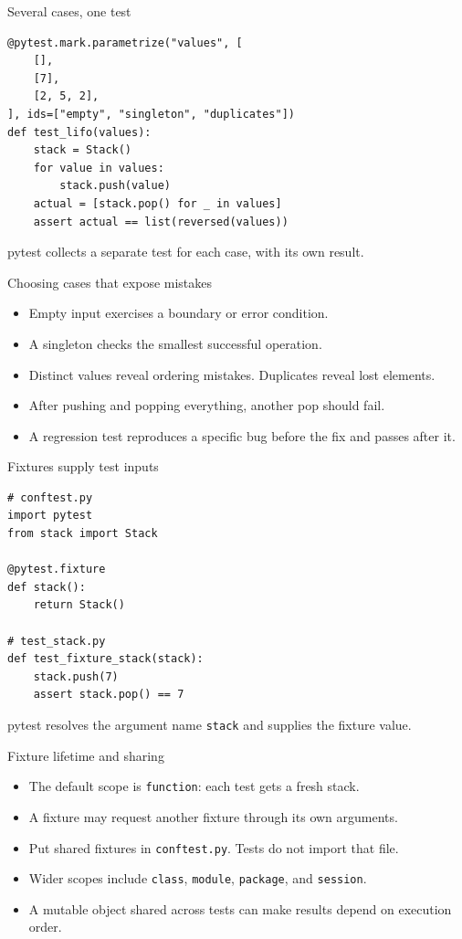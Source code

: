 \documentclass[aspectratio=169,11pt]{beamer}
\newcommand{\code}[1]{\texttt{#1}}
\begin{document}
\begin{frame}[fragile]{Several cases, one test}
\begin{lstlisting}
@pytest.mark.parametrize("values", [
    [],
    [7],
    [2, 5, 2],
], ids=["empty", "singleton", "duplicates"])
def test_lifo(values):
    stack = Stack()
    for value in values:
        stack.push(value)
    actual = [stack.pop() for _ in values]
    assert actual == list(reversed(values))
\end{lstlisting}
pytest collects a separate test for each case, with its own result.
\end{frame}

\begin{frame}[fragile]{Choosing cases that expose mistakes}
\begin{itemize}
\item Empty input exercises a boundary or error condition.
\item A singleton checks the smallest successful operation.
\item Distinct values reveal ordering mistakes. Duplicates reveal lost elements.
\item After pushing and popping everything, another pop should fail.
\item A regression test reproduces a specific bug before the fix and passes after it.
\end{itemize}
\end{frame}

\begin{frame}[fragile]{Fixtures supply test inputs}
\begin{lstlisting}
# conftest.py
import pytest
from stack import Stack

@pytest.fixture
def stack():
    return Stack()

# test_stack.py
def test_fixture_stack(stack):
    stack.push(7)
    assert stack.pop() == 7
\end{lstlisting}
pytest resolves the argument name \code{stack} and supplies the fixture value.
\end{frame}

\begin{frame}[fragile]{Fixture lifetime and sharing}
\begin{itemize}
\item The default scope is \code{function}: each test gets a fresh stack.
\item A fixture may request another fixture through its own arguments.
\item Put shared fixtures in \code{conftest.py}. Tests do not import that file.
\item Wider scopes include \code{class}, \code{module}, \code{package}, and \code{session}.
\item A mutable object shared across tests can make results depend on execution order.
\end{itemize}
\end{frame}
\end{document}
